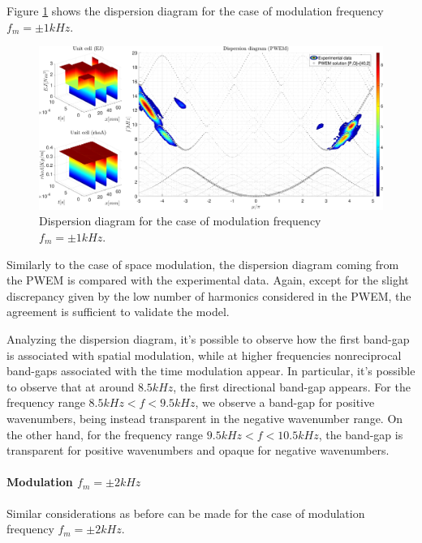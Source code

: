 Figure \ref{fig:PWEM_EXP_Sinusoidal_(discrete)_@1kHz} shows the dispersion diagram for the case of modulation frequency $f_m = \pm 1 kHz$.

\begin{figure}[H]
    \centering
    \includegraphics[width=\textwidth]{img/MATLAB/PWEM_EXP Sinusoidal (discrete) @1kHz.pdf}
    \caption{Dispersion diagram for the case of modulation frequency $f_m = \pm 1 kHz$.}
    \label{fig:PWEM_EXP_Sinusoidal_(discrete)_@1kHz}
\end{figure}

Similarly to the case of space modulation, the dispersion diagram coming from the PWEM is compared with the experimental data.
Again, except for the slight discrepancy given by the low number of harmonics considered in the PWEM, the agreement is sufficient to validate the model.

Analyzing the dispersion diagram, it's possible to observe how the first band-gap is associated with spatial modulation, while at higher frequencies nonreciprocal band-gaps associated with the time modulation appear.
In particular, it's possible to observe that at around $8.5kHz$, the first directional band-gap appears.
For the frequency range $8.5kHz < f < 9.5kHz$, we observe a band-gap for positive wavenumbers, being instead transparent in the negative wavenumber range.
On the other hand, for the frequency range $9.5kHz < f < 10.5kHz$, the band-gap is transparent for positive wavenumbers and opaque for negative wavenumbers.



\paragraph{Modulation $f_m = \pm 2 kHz$}

Similar considerations as before can be made for the case of modulation frequency $f_m = \pm 2 kHz$.

